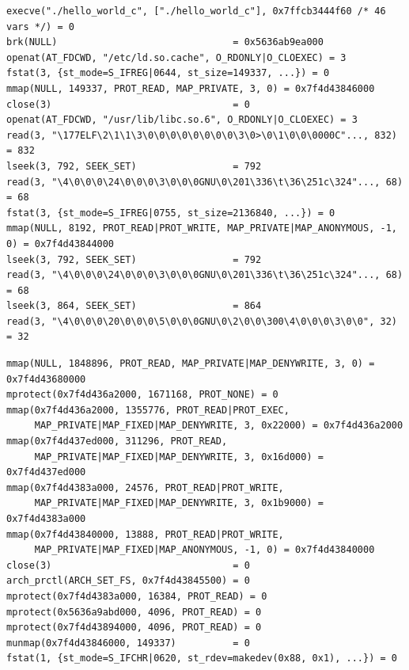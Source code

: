\begin{slide}


  \begin{verbatim}
execve("./hello_world_c", ["./hello_world_c"], 0x7ffcb3444f60 /* 46 vars */) = 0
brk(NULL)                               = 0x5636ab9ea000
openat(AT_FDCWD, "/etc/ld.so.cache", O_RDONLY|O_CLOEXEC) = 3
fstat(3, {st_mode=S_IFREG|0644, st_size=149337, ...}) = 0
mmap(NULL, 149337, PROT_READ, MAP_PRIVATE, 3, 0) = 0x7f4d43846000
close(3)                                = 0
openat(AT_FDCWD, "/usr/lib/libc.so.6", O_RDONLY|O_CLOEXEC) = 3
read(3, "\177ELF\2\1\1\3\0\0\0\0\0\0\0\0\3\0>\0\1\0\0\0000C"..., 832) = 832
lseek(3, 792, SEEK_SET)                 = 792
read(3, "\4\0\0\0\24\0\0\0\3\0\0\0GNU\0\201\336\t\36\251c\324"..., 68) = 68
fstat(3, {st_mode=S_IFREG|0755, st_size=2136840, ...}) = 0
mmap(NULL, 8192, PROT_READ|PROT_WRITE, MAP_PRIVATE|MAP_ANONYMOUS, -1, 0) = 0x7f4d43844000
lseek(3, 792, SEEK_SET)                 = 792
read(3, "\4\0\0\0\24\0\0\0\3\0\0\0GNU\0\201\336\t\36\251c\324"..., 68) = 68
lseek(3, 864, SEEK_SET)                 = 864
read(3, "\4\0\0\0\20\0\0\0\5\0\0\0GNU\0\2\0\0\300\4\0\0\0\3\0\0", 32) = 32
  \end{verbatim}

\end{slide}

\begin{slide}


  \begin{verbatim}
mmap(NULL, 1848896, PROT_READ, MAP_PRIVATE|MAP_DENYWRITE, 3, 0) = 0x7f4d43680000
mprotect(0x7f4d436a2000, 1671168, PROT_NONE) = 0
mmap(0x7f4d436a2000, 1355776, PROT_READ|PROT_EXEC,
     MAP_PRIVATE|MAP_FIXED|MAP_DENYWRITE, 3, 0x22000) = 0x7f4d436a2000
mmap(0x7f4d437ed000, 311296, PROT_READ,
     MAP_PRIVATE|MAP_FIXED|MAP_DENYWRITE, 3, 0x16d000) = 0x7f4d437ed000
mmap(0x7f4d4383a000, 24576, PROT_READ|PROT_WRITE,
     MAP_PRIVATE|MAP_FIXED|MAP_DENYWRITE, 3, 0x1b9000) = 0x7f4d4383a000
mmap(0x7f4d43840000, 13888, PROT_READ|PROT_WRITE,
     MAP_PRIVATE|MAP_FIXED|MAP_ANONYMOUS, -1, 0) = 0x7f4d43840000
close(3)                                = 0
arch_prctl(ARCH_SET_FS, 0x7f4d43845500) = 0
mprotect(0x7f4d4383a000, 16384, PROT_READ) = 0
mprotect(0x5636a9abd000, 4096, PROT_READ) = 0
mprotect(0x7f4d43894000, 4096, PROT_READ) = 0
munmap(0x7f4d43846000, 149337)          = 0
fstat(1, {st_mode=S_IFCHR|0620, st_rdev=makedev(0x88, 0x1), ...}) = 0
  \end{verbatim}

\end{slide}

